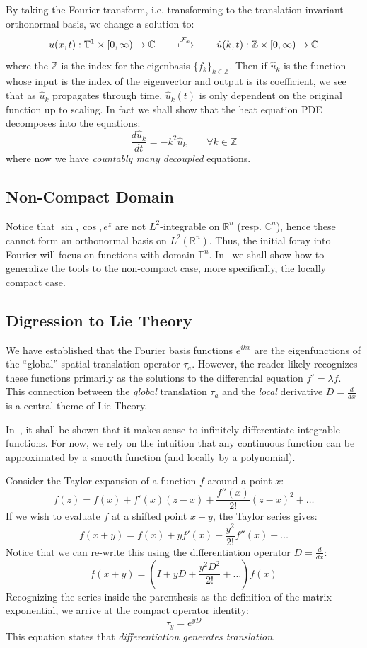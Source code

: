 \documentclass{article}
\newcommand{\C}{{\mathbb{C}}}
\newcommand{\R}{{\mathbb{R}}}
\newcommand{\T}{{\mathbb{T}}}
\newcommand{\Z}{{\mathbb{Z}}}
\newcommand{\CF}{{\mathcal{F}}}
\begin{document}
By taking the Fourier transform, i.e. transforming to the
translation-invariant orthonormal basis, we change a solution to:
\[
	u(x,t): \T^1 \times [0, \infty) \to \C\qquad \xmapsto{\CF_x}\qquad \hat{u}(k, t): \Z\times [0,\infty) \to \C
\]
where the $\Z$ is the index for the eigenbasis $\{f_k\}_{k \in \Z}$. Then if $\hat{u}_k$ is the function whose
input is the index of the eigenvector and output is its coefficient, we see that as $\hat{u}_k$ propagates
through time, $\hat{u}_k(t)$ is only dependent on the original function up to scaling. In fact
we shall show that the heat equation PDE decomposes into the equations:
\[
	\frac{d \hat{u}_k}{dt} = -k^2 \hat{u}_k \qquad \forall k \in \Z
\]
where now we have \emph{countably many decoupled} equations.


\subsection*{Non-Compact Domain}

Notice that $\sin, \cos, e^{z}$ are not $L^2$-integrable on $\R^n$ (resp. $\C^n$), hence these cannot form an
orthonormal basis on $L^2(\R^n)$. Thus, the initial foray into Fourier will focus on functions with domain
$\T^n$. In~\cite{NateRealAnalysis} we shall show how to generalize the tools to the non-compact
case, more specifically, the locally compact case.


\subsection*{Digression to Lie Theory}

We have established that the Fourier basis functions $e^{ikx}$ are the eigenfunctions of the ``global''
spatial translation operator $\tau_a$. However, the reader likely recognizes these functions primarily as
the solutions to the differential equation $f' = \lambda f$. This connection between the \emph{global}
translation $\tau_a$ and the \emph{local} derivative $D = \frac{d}{dx}$ is a central theme of Lie Theory.

In~\cite{NateRealAnalysis}, it shall be shown that it makes sense to infinitely differentiate
integrable functions. For now, we rely on the intuition that any continuous function can be approximated by
a smooth function (and locally by a polynomial).

Consider the Taylor expansion of a function $f$ around a point $x$:
\[
	f(z) = f(x) + f'(x)(z-x) + \frac{f''(x)}{2!}(z-x)^2 + \dots
\]
If we wish to evaluate $f$ at a shifted point $x+y$, the Taylor series gives:
\[
	f(x+y) = f(x) + y f'(x) + \frac{y^2}{2!} f''(x) + \dots
\]
Notice that we can re-write this using the differentiation operator $D = \frac{d}{dx}$:
\[
	f(x+y) = \left( I + yD + \frac{y^2 D^2}{2!} + \dots \right) f(x)
\]
Recognizing the series inside the parenthesis as the definition of the matrix exponential, we arrive at the
compact operator identity:
\[
	\tau_y = e^{y D}
\]
This equation states that \emph{differentiation generates translation}.
\end{document}
